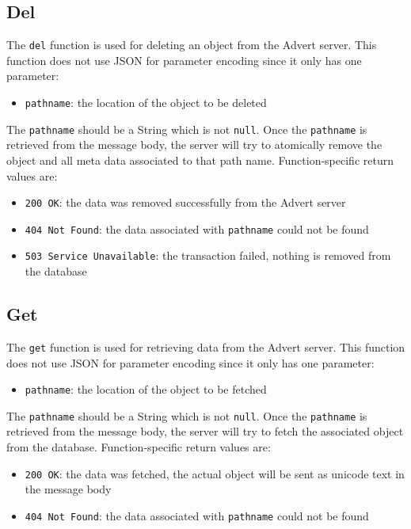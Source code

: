 \documentclass[a4paper,10pt]{article}
\begin{document}
\subsection{Del}
\label{del}
The \texttt{del} function is used for deleting an object from the Advert
server. This function does not use JSON for parameter encoding since it only
has one parameter:

\begin{itemize}
  \item \texttt{pathname}: the location of the object to be deleted
\end{itemize}

The \texttt{pathname} should be a String which is not \texttt{null}. Once the
\texttt{pathname} is retrieved from the message body, the server will try to
atomically remove the object and all meta data associated to that path name.
Function-specific return values are:

\begin{itemize}
  \item \texttt{200 OK}: the data was removed successfully from the Advert
  server
  \item \texttt{404 Not Found}: the data associated with \texttt{pathname}
  could not be found
  \item \texttt{503 Service Unavailable}: the transaction failed, nothing is
  removed from the database
\end{itemize}

\subsection{Get}
\label{get}
The \texttt{get} function is used for retrieving data from the Advert server.
This function does not use JSON for parameter encoding since it only has one
parameter:

\begin{itemize}
  \item \texttt{pathname}: the location of the object to be fetched
\end{itemize}

The \texttt{pathname} should be a String which is not \texttt{null}. Once the
\texttt{pathname} is retrieved from the message body, the server will try to
fetch the associated object from the database. Function-specific return values
are:

\begin{itemize}
  \item \texttt{200 OK}: the data was fetched, the actual object will be sent
  as unicode text in the message body
  \item \texttt{404 Not Found}: the data associated with \texttt{pathname}
  could not be found
\end{itemize}
\end{document}
